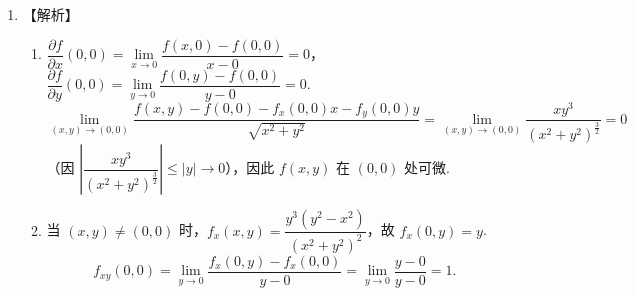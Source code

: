 \documentclass[a4paper,11pt]{ctexart}
\begin{document}
\begin{enumerate}[label=\arabic*., start=11, leftmargin=2em, itemsep=0.9em, topsep=0.6em]
  \item 【解析】
  \begin{enumerate}[label=(\arabic*), leftmargin=2em, itemsep=0.4em, topsep=0.3em]
    \item $\dfrac{\partial f}{\partial x}(0,0) = \lim\limits_{x\to 0} \dfrac{f(x,0) - f(0,0)}{x - 0} = 0$，$\dfrac{\partial f}{\partial y}(0,0) = \lim\limits_{y\to 0} \dfrac{f(0,y) - f(0,0)}{y - 0} = 0$.
    \[
      \lim_{(x,y)\to(0,0)} \frac{f(x,y) - f(0,0) - f_x(0,0)x - f_y(0,0)y}{\sqrt{x^2+y^2}} = \lim_{(x,y)\to(0,0)} \frac{xy^3}{(x^2+y^2)^{\frac{3}{2}}} = 0
    \]
    （因 $\left|\dfrac{xy^3}{(x^2+y^2)^{\frac{3}{2}}}\right| \le |y| \to 0$），因此 $f(x,y)$ 在 $(0,0)$ 处可微.

    \item 当 $(x,y) \neq (0,0)$ 时，$f_x(x,y) = \dfrac{y^3(y^2 - x^2)}{(x^2+y^2)^2}$，故 $f_x(0,y) = y$.
    \[
      f_{xy}(0,0) = \lim_{y\to 0} \frac{f_x(0,y) - f_x(0,0)}{y - 0} = \lim_{y\to 0} \frac{y - 0}{y - 0} = 1.
    \]
  \end{enumerate}
\end{enumerate}
\end{document}
